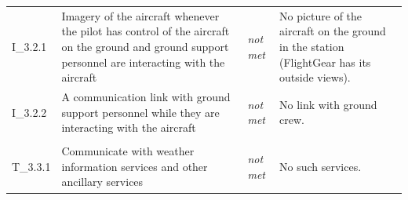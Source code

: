 \begin{longtable}{@{}>{\raggedright\arraybackslash}p{12mm}>{\raggedright\arraybackslash}p{57mm}>{\raggedright\arraybackslash}p{13mm}>{\raggedright\arraybackslash}p{70mm}@{}}
I\_3.2.1 & Imagery of the aircraft whenever the pilot has control of the aircraft on the ground and ground support personnel are interacting with the aircraft & \emph{not met} & No picture of the aircraft on the ground in the station (FlightGear has its outside views). \\
I\_3.2.2 & A communication link with ground support personnel while they are interacting with the aircraft & \emph{not met} & No link with ground crew. \\
\addlinespace\multicolumn{4}{@{}l}{\textbf{Other services}} \\
T\_3.3.1 & Communicate with weather information services and other ancillary services & \emph{not met} & No such services. \\
\bottomrule
\end{longtable}
